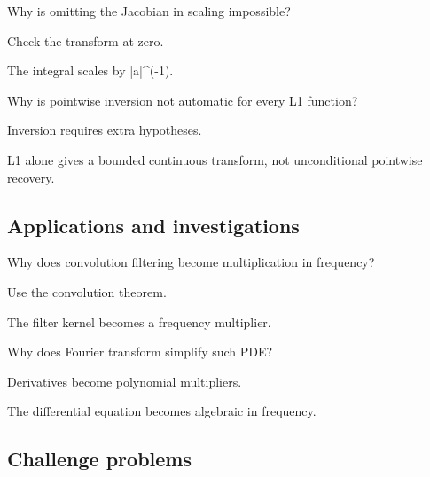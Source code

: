 \begin{exercise}\label{exr:iii11-expand-11}
Why is omitting the Jacobian in scaling impossible?
\end{exercise}
\begin{hint}
Check the transform at zero.
\end{hint}
\begin{solution}
The integral scales by |a|\textasciicircum{}(-1).
\end{solution}

\begin{exercise}\label{exr:iii11-expand-12}
Why is pointwise inversion not automatic for every L1 function?
\end{exercise}
\begin{hint}
Inversion requires extra hypotheses.
\end{hint}
\begin{solution}
L1 alone gives a bounded continuous transform, not unconditional pointwise recovery.
\end{solution}

\subsection*{Applications and investigations}

\begin{exercise}[Filtering]\label{exr:iii11-expand-13}
Why does convolution filtering become multiplication in frequency?
\end{exercise}
\begin{hint}
Use the convolution theorem.
\end{hint}
\begin{solution}
The filter kernel becomes a frequency multiplier.
\end{solution}

\begin{exercise}\label{exr:iii11-expand-14}
Why does Fourier transform simplify such PDE?
\end{exercise}
\begin{hint}
Derivatives become polynomial multipliers.
\end{hint}
\begin{solution}
The differential equation becomes algebraic in frequency.
\end{solution}

\subsection*{Challenge problems}

